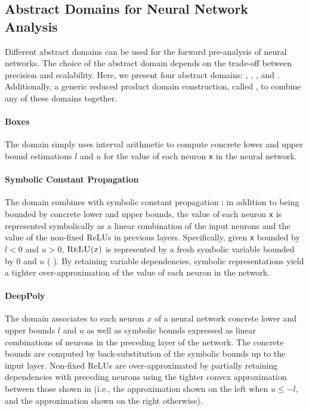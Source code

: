 \subsection{Abstract Domains for Neural Network Analysis}

Different abstract domains can be used for the forward pre-analysis of neural networks.
The choice of the abstract domain depends on the trade-off between precision and scalability.
Here, we present four abstract domains: \boxes, \symbolic, \deeppoly, and \neurify. Additionally, a generic reduced product domain construction, called \reducedproduct, to combine any of these domains together.

\paragraph{Boxes}


The \boxes{} domain simply uses interval arithmetic \cite{Hickey2001} to compute concrete lower and upper bound estimations $l$ and $u$ for the value of each neuron \texttt{x} in the neural network.


\paragraph{Symbolic Constant Propagation}

The \symbolic{} domain combines \boxes{} with symbolic constant propagation \cite{Mine2006symbolic}: in addition to being bounded by concrete lower and upper bounds, the value of each neuron \texttt{x} is represented symbolically as a linear combination of the input neurons and the value of the non-fixed ReLUs in previous layers. Specifically, given \texttt{x} bounded by $l < 0$ and $u > 0$, $\textsc{ReLU}(x)$ is represented by a fresh symbolic variable bounded by $0$ and $u$ (\cf{} ). By retaining variable dependencies, symbolic representations yield a tighter over-approximation of the value of each neuron in the network.


\paragraph{DeepPoly}

The \deeppoly{} domain associates to each neuron $x$ of a neural network concrete lower and upper bounds $l$ and $u$ as well as symbolic bounds expressed as linear combinations of neurons in the preceding layer of the network.
%
The concrete bounds are computed by back-substitution of the symbolic bounds up to the input layer. Non-fixed ReLUs are over-approximated by partially retaining dependencies with preceding neurons using the tighter convex approximation between those shown in  (i.e., the approximation shown on the left when $u \leq -l$, and the approximation shown on the right otherwise).

